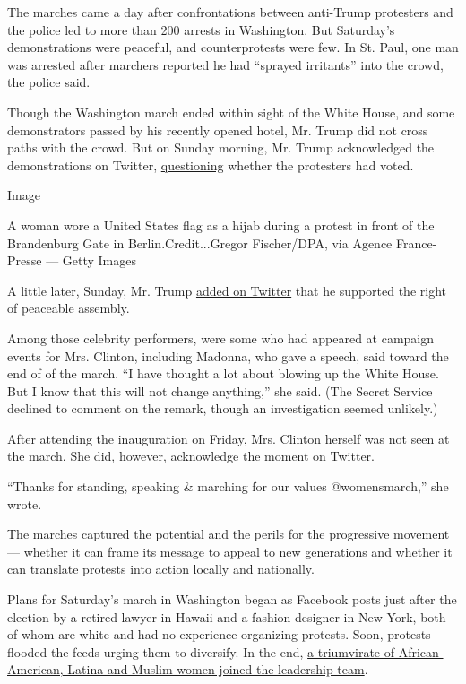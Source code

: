 The marches came a day after confrontations between anti-Trump
protesters and the police led to more than 200 arrests in Washington.
But Saturday's demonstrations were peaceful, and counterprotests were
few. In St. Paul, one man was arrested after marchers reported he had
``sprayed irritants'' into the crowd, the police said.

Though the Washington march ended within sight of the White House, and
some demonstrators passed by his recently opened hotel, Mr. Trump did
not cross paths with the crowd. But on Sunday morning, Mr. Trump
acknowledged the demonstrations on Twitter,
\href{https://twitter.com/realDonaldTrump/status/823150055418920960}{questioning}
whether the protesters had voted.

Image

A woman wore a United States flag as a hijab during a protest in front
of the Brandenburg Gate in Berlin.Credit...Gregor Fischer/DPA, via
Agence France-Presse --- Getty Images

A little later, Sunday, Mr. Trump
\href{https://twitter.com/realDonaldTrump/status/823174199036542980}{added
on Twitter} that he supported the right of peaceable assembly.

Among those celebrity performers, were some who had appeared at campaign
events for Mrs. Clinton, including Madonna, who gave a speech, said
toward the end of of the march. ``I have thought a lot about blowing up
the White House. But I know that this will not change anything,'' she
said. (The Secret Service declined to comment on the remark, though an
investigation seemed unlikely.)

After attending the inauguration on Friday, Mrs. Clinton herself was not
seen at the march. She did, however, acknowledge the moment on Twitter.

``Thanks for standing, speaking \& marching for our values
@womensmarch,'' she wrote.

The marches captured the potential and the perils for the progressive
movement --- whether it can frame its message to appeal to new
generations and whether it can translate protests into action locally
and nationally.

Plans for Saturday's march in Washington began as Facebook posts just
after the election by a retired lawyer in Hawaii and a fashion designer
in New York, both of whom are white and had no experience organizing
protests. Soon, protests flooded the feeds urging them to diversify. In
the end,
\href{https://www.nytimes3xbfgragh.onion/2017/01/09/us/womens-march-on-washington-opens-contentious-dialogues-about-race.html}{a
triumvirate of African-American, Latina and Muslim women joined the
leadership team}.

